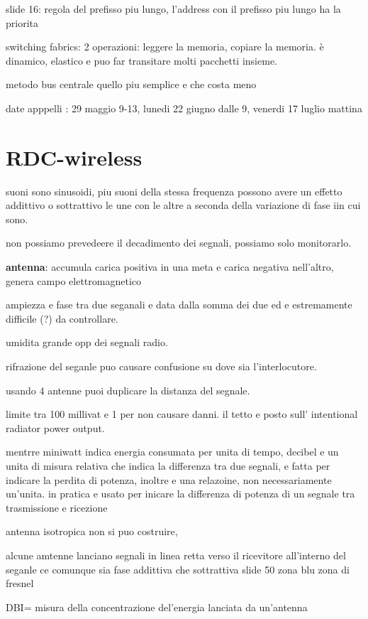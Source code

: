 \documentclass[12pt]{article}
\begin{document}
slide 16: regola del prefisso piu lungo, l'address con il prefisso piu lungo ha la priorita

switching fabrics: 2 operazioni: leggere la memoria, copiare la memoria.
è dinamico, elastico e puo far transitare molti pacchetti insieme.

metodo bus centrale quello piu semplice e che costa meno

date apppelli : 29 maggio 9-13, lunedi 22 giugno dalle 9, venerdi 17 luglio mattina

\section{RDC-wireless}

suoni sono sinusoidi, piu suoni della stessa frequenza possono avere un effetto addittivo o sottrattivo le une con le altre a seconda della variazione di fase iin cui sono.

 non possiamo prevedeere il decadimento dei segnali, possiamo solo monitorarlo.

 \textbf{antenna}: accumula carica positiva in una meta e carica negativa nell'altro, genera campo elettromagnetico 

ampiezza e fase tra due seganali e data dalla somma dei due ed e estremamente difficile (?) da controllare.

umidita grande opp dei segnali radio.

rifrazione del seganle puo causare confusione su dove sia l'interlocutore.

usando 4 antenne puoi duplicare la distanza del segnale.

limite tra 100 millivat e 1 per non causare danni.
il tetto e posto sull' intentional radiator power output.

mentrre miniwatt indica energia consumata per unita di tempo, decibel e un unita di misura relativa che indica la differenza tra due segnali, e fatta per indicare la perdita di potenza, inoltre e una relazoine, non necessariamente un'unita.
in pratica e usato per inicare la differenza di potenza di un segnale tra trasmissione e ricezione

 antenna isotropica non si puo costruire,

alcune amtenne lanciano segnali in linea retta verso il ricevitore all'interno del seganle ce comunque sia fase addittiva che sottrattiva
slide 50 zona blu zona di fresnel

DBI= misura della concentrazione del'energia lanciata da un'antenna
\end{document}
